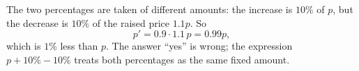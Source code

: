 The two percentages are taken of different amounts: the increase is $10\%$ of $p$, but the decrease is $10\%$ of the raised price $1.1p$. So
\[p'=0.9\cdot1.1\,p=\boxed{0.99p},\]
which is $1\%$ less than $p$. The answer ``yes'' is wrong; the expression $p+10\%-10\%$ treats both percentages as the same fixed amount.
